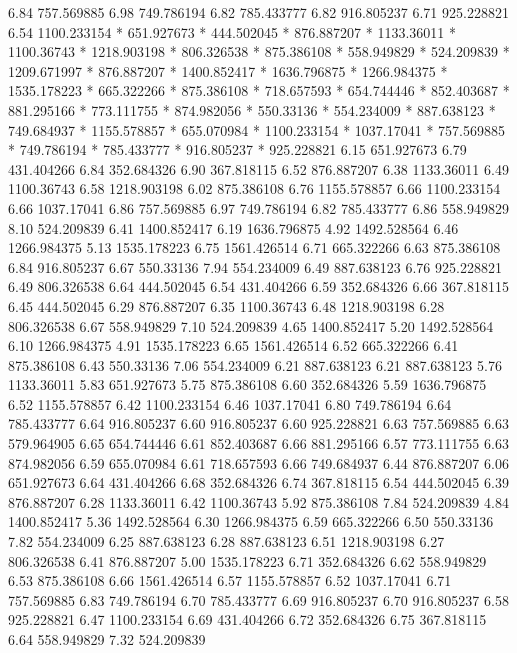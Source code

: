 6.84 	757.569885
6.98 	749.786194
6.82 	785.433777
6.82 	916.805237
6.71 	925.228821
6.54 	1100.233154
*	651.927673
*	444.502045
*	876.887207
*	1133.36011
*	1100.36743
*	1218.903198
*	806.326538
*	875.386108
*	558.949829
*	524.209839
*	1209.671997
*	876.887207
*	1400.852417
*	1636.796875
*	1266.984375
*	1535.178223
*	665.322266
*	875.386108
*	718.657593
*	654.744446
*	852.403687
*	881.295166
*	773.111755
*	874.982056
*	550.33136
*	554.234009
*	887.638123
*	749.684937
*	1155.578857
*	655.070984
*	1100.233154
*	1037.17041
*	757.569885
*	749.786194
*	785.433777
*	916.805237
*	925.228821
6.15 	651.927673
6.79 	431.404266
6.84 	352.684326
6.90 	367.818115
6.52 	876.887207
6.38 	1133.36011
6.49 	1100.36743
6.58 	1218.903198
6.02 	875.386108
6.76 	1155.578857
6.66 	1100.233154
6.66 	1037.17041
6.86 	757.569885
6.97 	749.786194
6.82 	785.433777
6.86 	558.949829
8.10 	524.209839
6.41 	1400.852417
6.19 	1636.796875
4.92 	1492.528564
6.46 	1266.984375
5.13 	1535.178223
6.75 	1561.426514
6.71 	665.322266
6.63 	875.386108
6.84 	916.805237
6.67 	550.33136
7.94 	554.234009
6.49 	887.638123
6.76 	925.228821
6.49 	806.326538
6.64 	444.502045
6.54 	431.404266
6.59 	352.684326
6.66 	367.818115
6.45 	444.502045
6.29 	876.887207
6.35 	1100.36743
6.48 	1218.903198
6.28 	806.326538
6.67 	558.949829
7.10 	524.209839
4.65 	1400.852417
5.20 	1492.528564
6.10 	1266.984375
4.91 	1535.178223
6.65 	1561.426514
6.52 	665.322266
6.41 	875.386108
6.43 	550.33136
7.06 	554.234009
6.21 	887.638123
6.21 	887.638123
5.76 	1133.36011
5.83 	651.927673
5.75 	875.386108
6.60 	352.684326
5.59 	1636.796875
6.52 	1155.578857
6.42 	1100.233154
6.46 	1037.17041
6.80 	749.786194
6.64 	785.433777
6.64 	916.805237
6.60 	916.805237
6.60 	925.228821
6.63 	757.569885
6.63 	579.964905
6.65 	654.744446
6.61 	852.403687
6.66 	881.295166
6.57 	773.111755
6.63 	874.982056
6.59 	655.070984
6.61 	718.657593
6.66 	749.684937
6.44 	876.887207
6.06 	651.927673
6.64 	431.404266
6.68 	352.684326
6.74 	367.818115
6.54 	444.502045
6.39 	876.887207
6.28 	1133.36011
6.42 	1100.36743
5.92 	875.386108
7.84 	524.209839
4.84 	1400.852417
5.36 	1492.528564
6.30 	1266.984375
6.59 	665.322266
6.50 	550.33136
7.82 	554.234009
6.25 	887.638123
6.28 	887.638123
6.51 	1218.903198
6.27 	806.326538
6.41 	876.887207
5.00 	1535.178223
6.71 	352.684326
6.62 	558.949829
6.53 	875.386108
6.66 	1561.426514
6.57 	1155.578857
6.52 	1037.17041
6.71 	757.569885
6.83 	749.786194
6.70 	785.433777
6.69 	916.805237
6.70 	916.805237
6.58 	925.228821
6.47 	1100.233154
6.69 	431.404266
6.72 	352.684326
6.75 	367.818115
6.64 	558.949829
7.32 	524.209839
